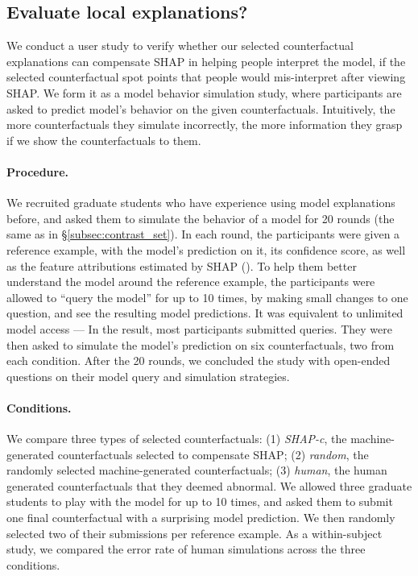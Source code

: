 \subsection{Evaluate local explanations?}
We conduct a user study to verify whether our selected counterfactual explanations can compensate SHAP in helping people interpret the model, \ie if the selected counterfactual spot points that people would mis-interpret after viewing SHAP.
We form it as a model behavior simulation study, where participants are asked to predict model's behavior on the given counterfactuals.
Intuitively, the more counterfactuals they simulate incorrectly, the more information they grasp if we show the counterfactuals to them.

\paragraph{Procedure.}
We recruited  graduate students who have experience using model explanations before, and asked them to simulate the behavior of a \qqp model for 20 rounds (the same as in \S\ref{subsec:contrast_set}).
In each round, the participants were given a reference example, with the model's prediction on it, its confidence score, as well as the feature attributions estimated by SHAP ().
To help them better understand the model around the reference example, the participants were allowed to ``query the model'' for up to 10 times, by making small changes to one question, and see the resulting model predictions.
It was equivalent to unlimited model access --- In the result, most participants submitted  queries.
They were then asked to simulate the model's prediction on six counterfactuals, two from each condition.
After the 20 rounds, we concluded the study with open-ended questions on their model query and simulation strategies.

\paragraph{Conditions.} 
We compare three types of selected counterfactuals:
(1) \emph{SHAP-c}, the machine-generated counterfactuals selected to compensate SHAP; 
(2) \emph{random}, the randomly selected machine-generated counterfactuals; 
(3) \emph{human}, 
the human generated counterfactuals that they deemed abnormal.
We allowed three graduate students to play with the model for up to 10 times, and asked them to submit one final counterfactual with a surprising model prediction.
We then randomly selected two of their submissions per reference example.
As a within-subject study, we compared the error rate of human simulations across the three conditions.


